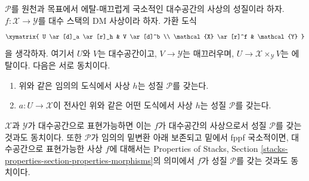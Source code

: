 \begin{lemma}
\label{lemma-etale-smooth-local-source-target}
$\mathcal{P}$를 원천과 목표에서 에탈-매끄럽게 국소적인 대수공간의 사상의
성질이라 하자. $f : \mathcal{X} \to \mathcal{Y}$를 대수 스택의 DM
사상이라 하자. 가환 도식
$$
\xymatrix{
U \ar[d]_a \ar[r]_h & V \ar[d]^b \\
\mathcal{X} \ar[r]^f & \mathcal{Y}
}
$$
을 생각하자. 여기서 $U$와 $V$는 대수공간이고,
$V \to \mathcal{Y}$는 매끄러우며,
$U \to \mathcal{X} \times_\mathcal{Y} V$는 에탈이다. 다음은 서로
동치이다.
\begin{enumerate}
\item 위와 같은 임의의 도식에서 사상 $h$는 성질 $\mathcal{P}$를 갖는다.
\item $a : U \to \mathcal{X}$이 전사인 위와 같은 어떤 도식에서 사상
$h$는 성질 $\mathcal{P}$를 갖는다.
\end{enumerate}
$\mathcal{X}$과 $\mathcal{Y}$가 대수공간으로 표현가능하면 이는
$f$가 대수공간의 사상으로서 성질 $\mathcal{P}$를 갖는 것과도 동치이다.
또한 $\mathcal{P}$가 임의의 밑변환 아래 보존되고 밑에서 fppf 국소적이면,
대수공간으로 표현가능한 사상 $f$에 대해서는 Properties of Stacks,
Section \ref{stacks-properties-section-properties-morphisms}의 의미에서
$f$가 성질 $\mathcal{P}$를 갖는 것과도 동치이다.
\end{lemma}

